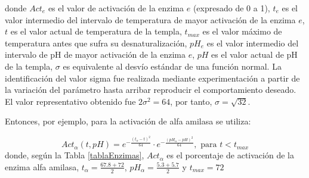         \noindent donde $Act_e$ es el valor de activación de la enzima $e$ (expresado de 0 a 1), $t_e$ es el valor intermedio del intervalo de temperatura de mayor activación de la enzima $e$, $t$ es el valor actual de temperatura de la templa, $t_{max}$ es el valor máximo de temperatura antes que sufra su desnaturalización, $pH_e$ es el valor intermedio del intervalo de pH de mayor activación de la enzima $e$, $pH$ es el valor actual de pH de la templa, $\sigma$ es equivalente al desvío estándar de una función normal. La identificación del valor sigma fue realizada mediante experimentación a partir de la variación del parámetro hasta arribar reproducir el comportamiento deseado. El valor representativo obtenido fue $2\sigma^2=64$, por tanto, $\sigma=\sqrt{32}$. 
        
        \par Entonces, por ejemplo, para la activación de alfa amilasa se utiliza:
        
        \begin{equation}
            Act_\alpha(t, pH) = e^{- \frac{(t_\alpha - t)^2}{64}} \cdot e^{- \frac{(pH_\alpha - pH)^2}{64}}, \text{ para } t< t_{max} 
        \end{equation}
        \noindent donde, según la Tabla \ref{tablaEnzimas}, $Act_\alpha$ es el porcentaje de activación de la enzima alfa amilasa, $t_\alpha = \frac{67.8 + 72}{2}$, $pH_\alpha = \frac{5.3 + 5.7}{2}$ y $t_{max} = 72$